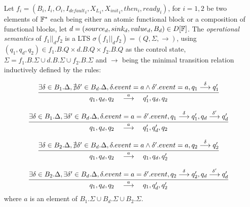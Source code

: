\documentclass[runningheads]{llncs}
\newcommand{\aoverb}[2]{\stackrel{\mathclap{\footnotesize #1}}{#2}}
\newcommand{\s}{\hspace{1em}}
\begin{document}
\begin{definition}
    Let $f_i = (B_i, I_i, O_i, {I_{default}}_i, {X_L}_i, {X_{init}}_i, then_i, ready_i)$, for $i = 1,2$ be two elements of $\mathbb{F}^*$ each being either an atomic functional block or a composition of functional blocks, let $d = (source_d,sink_d,value_d,B_d) \in D[\mathbb{F}]$. The \emph{operational semantics} of $f_1 ||_d f_2$ is a LTS $\sigma(f_1 ||_d f_2) = (Q,\Sigma, \rightarrow)$, using $(q_1,q_d,q_2) \in f_1.B.Q \times d.B.Q \times f_2.B.Q$ as the control state, $\Sigma = f_1.B.\Sigma \cup d.B.\Sigma \cup f_2.B.\Sigma$ and $\rightarrow$ being the minimal transition relation inductively defined by the rules:

    \begin{equation}
        \cfrac{
            \exists \delta \in B_1.\Delta, \nexists \delta' \in B_d.\Delta, \delta.event = a \wedge \delta'.event = a, q_1\aoverb{\delta}{\longrightarrow}q_1'
        }
        {
            q_1,q_d,q_2 \aoverb{a}{\s\longrightarrow\s} q_1',q_d,q_2
        }
    \end{equation}

    \begin{equation}
        \cfrac{
            \exists \delta \in B_1.\Delta, \exists \delta' \in B_d.\Delta, \delta.event = a = \delta'.event, q_1\aoverb{\delta}{\longrightarrow}q_1',q_d\aoverb{\delta'}{\longrightarrow}q_d' 
        }
        {
            q_1,q_d,q_2 \aoverb{a}{\s\longrightarrow\s} q_1',q_d',q_2
        }
    \end{equation}

    \begin{equation}
        \cfrac{
            \exists \delta \in B_2.\Delta, \nexists \delta' \in B_d.\Delta, \delta.event = a \wedge \delta'.event = a, q_2\aoverb{\delta}{\longrightarrow}q_2'
        }
        {
            q_1,q_d,q_2 \aoverb{a}{\s\longrightarrow\s} q_1,q_d,q_2'
        }
    \end{equation}

    \begin{equation}
        \cfrac{
            \exists \delta \in B_2.\Delta, \exists \delta' \in B_d.\Delta, \delta.event = a = \delta'.event, q_2\aoverb{\delta}{\longrightarrow}q_2',q_d\aoverb{\delta'}{\longrightarrow}q_d' 
        }
        {
            q_1,q_d,q_2 \aoverb{a}{\s\longrightarrow\s} q_1,q_d',q_2'
        }
    \end{equation}
    where $a$ is an element of $B_1.\Sigma \cup B_d.\Sigma \cup B_2.\Sigma$.
\end{definition}
\end{document}
